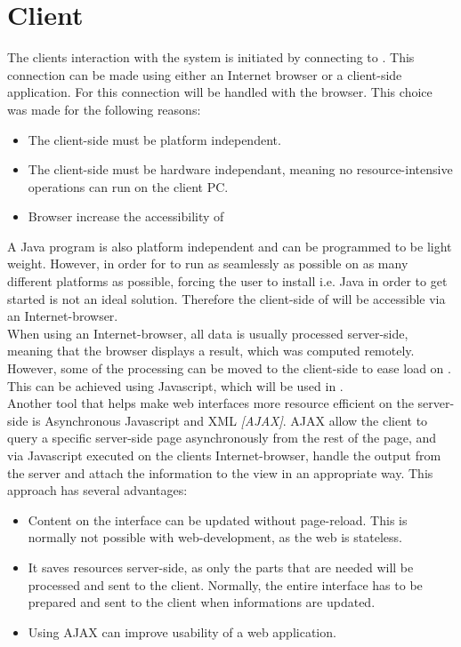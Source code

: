 
\section{Client}\label{sec:design_client}
The clients interaction with the system is initiated by connecting to .
This connection can be made using either an Internet browser or a client-side application.
For \projectname{} this connection will be handled with the browser.
This choice was made for the following reasons:

\begin{itemize}
	\item The client-side must be platform independent.
	\item The client-side must be hardware independant, meaning no resource-intensive operations can run on the client PC.
	\item Browser increase the accessibility of \projectname{}
\end{itemize}

A Java program is also platform independent and can be programmed to be light weight. 
However, in order for \projectname{} to run as seamlessly as possible on as many different platforms as possible, forcing the user to install i.e. Java in order to get started is not an ideal solution.
Therefore the client-side of \projectname{} will be accessible via an Internet-browser. \\

When using an Internet-browser, all data is usually processed server-side, meaning that the browser displays a result, which was computed remotely. 
However, some of the processing can be moved to the client-side to ease load on . 
This can be achieved using Javascript, which will be used in \projectname{}. \\

Another tool that helps make web interfaces more resource efficient on the server-side is Asynchronous Javascript and XML \emph{[AJAX]}. 
AJAX allow the client to query a specific server-side page asynchronously from the rest of the page, and via Javascript executed on the clients Internet-browser, handle the output from the server and attach the information to the view in an appropriate way. 
This approach has several advantages:

\begin{itemize}
	\item Content on the interface can be updated without page-reload. This is normally not possible with web-development, as the web is stateless.
	\item It saves resources server-side, as only the parts that are needed will be processed and sent to the client. Normally, the entire interface has to be prepared and sent to the client when informations are updated.
	\item Using AJAX can improve usability of a web application.
\end{itemize}

